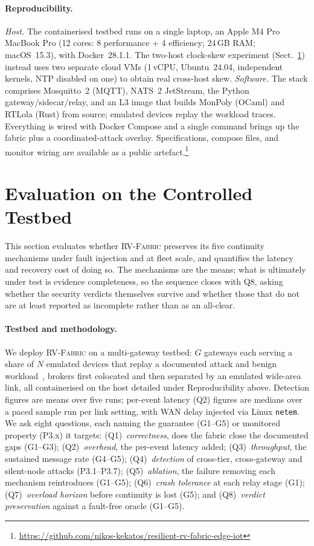 \documentclass[runningheads]{llncs}
\newcommand{\sys}{\textsc{RV-Fabric}\xspace}
\begin{document}
\paragraph{Reproducibility.}
\emph{Host.} The containerised testbed runs on a single laptop, an Apple M4 Pro
MacBook Pro (12 cores: 8 performance + 4 efficiency; 24\,GB RAM; macOS~15.3), with
Docker~28.1.1. The two-host clock-skew experiment
(Sect.~\ref{sec:eval}) instead uses two separate cloud VMs
(1\,vCPU, Ubuntu~24.04, independent kernels, NTP disabled on one) to obtain real
cross-host skew.
\emph{Software.} The stack comprises Mosquitto~2 (MQTT), NATS~2 JetStream, the
Python gateway/sidecar/relay, and an L3 image that builds MonPoly (OCaml) and
RTLola (Rust) from source; emulated devices replay the workload traces. Everything is
wired with Docker Compose and a single command brings up the fabric plus a
coordinated-attack overlay. Specifications, compose
files, and monitor wiring are available as a public
artefact.\footnote{\url{https://github.com/nikos-kekatos/resilient-rv-fabric-edge-iot}}

\section{Evaluation on the Controlled Testbed}
\label{sec:eval}
This section evaluates whether \sys preserves its five continuity mechanisms under
fault injection and at fleet scale, and quantifies the latency and recovery cost of
doing so. The mechanisms are the means; what is ultimately under test is evidence completeness, so
the sequence closes with Q8, asking whether the security verdicts themselves survive and
whether those that do not are at least reported as incomplete rather than as an
all-clear.

\paragraph{Testbed and methodology.}
We deploy \sys on a multi-gateway testbed: $G$ gateways each serving a share of $N$
emulated devices that replay a documented attack and benign
workload~\cite{ares2026,csr2026}, brokers first colocated and then separated by an emulated
wide-area link, all containerised on the host detailed under Reproducibility above.
Detection figures are means over five runs; per-event latency (Q2) figures are medians over
a paced sample run per link setting, with WAN delay injected via Linux \texttt{netem}. We ask eight questions, each naming the guarantee (G1--G5) or monitored property (P3.x)
it targets: (Q1)~\emph{correctness}, does the fabric close the documented gaps (G1--G3);
(Q2)~\emph{overhead}, the per-event latency added; (Q3)~\emph{throughput}, the sustained
message rate (G4--G5); (Q4)~\emph{detection} of cross-tier, cross-gateway and silent-node
attacks (P3.1--P3.7); (Q5)~\emph{ablation}, the failure removing each mechanism
reintroduces (G1--G5); (Q6)~\emph{crash tolerance} at each relay stage (G1);
(Q7)~\emph{overload horizon} before continuity is lost (G5); and (Q8)~\emph{verdict
preservation} against a fault-free oracle (G1--G5).
\end{document}

